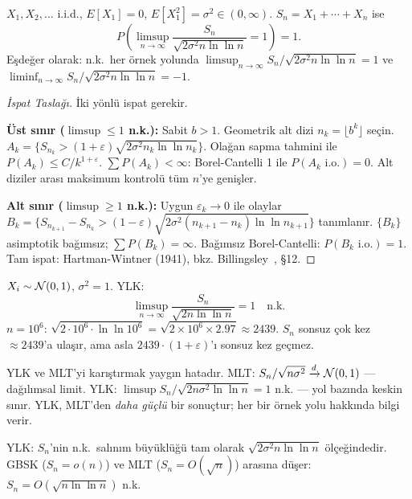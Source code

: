 \begin{teorem}
\label{thm:ylk}
$X_1, X_2, \ldots$ i.i.d., $E[X_1] = 0$, $E[X_1^2] = \sigma^2 \in (0,\infty)$.
$S_n = X_1 + \cdots + X_n$ ise
\[
  P\!\left(\limsup_{n\to\infty} \frac{S_n}{\sqrt{2\sigma^2 n \ln\ln n}} = 1\right) = 1.
\]
Eşdeğer olarak: n.k.\ her örnek yolunda
$\limsup_{n\to\infty} S_n/\sqrt{2\sigma^2 n\ln\ln n} = 1$
ve $\liminf_{n\to\infty} S_n/\sqrt{2\sigma^2 n\ln\ln n} = -1$.
\end{teorem}

\begin{proof}[İspat Taslağı]
İki yönlü ispat gerekir.

\textbf{Üst sınır ($\limsup \leq 1$ n.k.):}
Sabit $b > 1$. Geometrik alt dizi $n_k = \lfloor b^k \rfloor$ seçin.
$A_k = \{S_{n_k} > (1+\varepsilon)\sqrt{2\sigma^2 n_k \ln\ln n_k}\}$.
Olağan sapma tahmini ile $P(A_k) \leq C/k^{1+\varepsilon}$.
$\sum P(A_k) < \infty$: Borel-Cantelli 1 ile $P(A_k \text{ i.o.}) = 0$.
Alt diziler arası maksimum kontrolü tüm $n$'ye genişler.

\textbf{Alt sınır ($\limsup \geq 1$ n.k.):}
Uygun $\varepsilon_k \to 0$ ile olaylar
$B_k = \{S_{n_{k+1}} - S_{n_k} > (1-\varepsilon)\sqrt{2\sigma^2(n_{k+1}-n_k)\ln\ln n_{k+1}}\}$
tanımlanır. $\{B_k\}$ asimptotik bağımsız; $\sum P(B_k) = \infty$.
Bağımsız Borel-Cantelli: $P(B_k \text{ i.o.}) = 1$.
Tam ispat: Hartman-Wintner (1941), bkz. Billingsley~\cite{Billingsley1995}, §12.
\end{proof}

\begin{ornek}
$X_i \sim \mathcal{N}(0,1)$, $\sigma^2 = 1$. YLK:
\[
  \limsup_{n\to\infty} \frac{S_n}{\sqrt{2n\ln\ln n}} = 1 \quad \text{n.k.}
\]
$n = 10^6$: $\sqrt{2 \cdot 10^6 \cdot \ln\ln 10^6} = \sqrt{2\times10^6 \times 2.97} \approx 2439$.
$S_n$ sonsuz çok kez $\approx 2439$'a ulaşır, ama asla $2439 \cdot (1+\varepsilon)$'ı
sonsuz kez geçmez.
\end{ornek}

\begin{hataanalizi}
YLK ve MLT'yi karıştırmak yaygın hatadır.
MLT: $S_n/\sqrt{n\sigma^2} \xrightarrow{d} \mathcal{N}(0,1)$ --- dağılımsal limit.
YLK: $\limsup S_n/\sqrt{2n\sigma^2\ln\ln n} = 1$ n.k. --- yol bazında keskin sınır.
YLK, MLT'den \emph{daha güçlü} bir sonuçtur; her bir örnek yolu hakkında bilgi verir.
\end{hataanalizi}

\begin{mikroozet}
YLK: $S_n$'nin n.k.\ salınım büyüklüğü tam olarak $\sqrt{2\sigma^2 n \ln\ln n}$ ölçeğindedir.
GBSK ($S_n = o(n)$) ve MLT ($S_n = O(\sqrt{n})$) arasına düşer: $S_n = O(\sqrt{n\ln\ln n})$ n.k.
\end{mikroozet}

